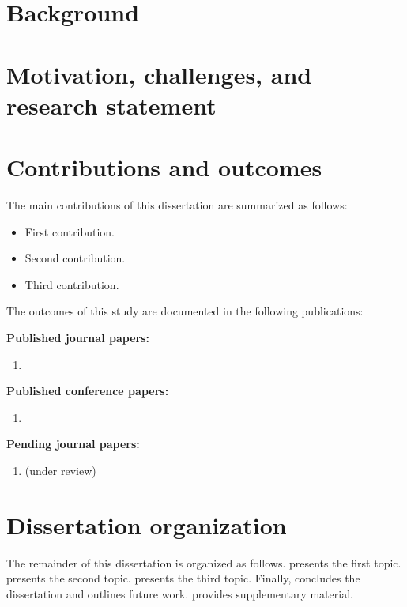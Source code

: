 \section{Background}
\lipsum[1-2]

\section{Motivation, challenges, and research statement}
\lipsum[3]

\section{Contributions and outcomes}
The main contributions of this dissertation are summarized as follows:

\begin{itemize}
\item First contribution. \lipsum[4][1-3]
\item Second contribution. \lipsum[5][1-3]
\item Third contribution. \lipsum[6][1-3]
\end{itemize}

The outcomes of this study are documented in the following publications:

\noindent\textbf{Published journal papers:}
\begin{enumerate}
\item {}
\end{enumerate}

\noindent\textbf{Published conference papers:}
\begin{enumerate}
\item {}
\end{enumerate}

\noindent\textbf{Pending journal papers:}
\begin{enumerate}
\item {} (under review)
\end{enumerate}

\section{Dissertation organization}
The remainder of this dissertation is organized as follows.
 presents the first topic.
 presents the second topic.
 presents the third topic.
Finally,  concludes the dissertation and outlines future work.
 provides supplementary material.
